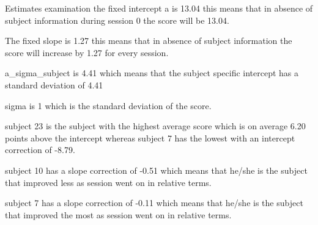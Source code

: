 \documentclass[
  ignorenonframetext,
]{beamer}
\begin{document}
\begin{frame}{Estimates examination}
\protect\hypertarget{estimates-examination}{}
the fixed intercept a is 13.04 this means that in absence of subject
information during session 0 the score will be 13.04.

The fixed slope is 1.27 this means that in absence of subject
information the score will increase by 1.27 for every session.

a\_sigma\_subject is 4.41 which means that the subject specific
intercept has a standard deviation of 4.41

sigma is 1 which is the standard deviation of the score.

subject 23 is the subject with the highest average score which is on
average 6.20 points above the intercept whereas subject 7 has the lowest
with an intercept correction of -8.79.

subject 10 has a slope correction of -0.51 which means that he/she is
the subject that improved less as session went on in relative terms.

subject 7 has a slope correction of -0.11 which means that he/she is the
subject that improved the most as session went on in relative terms.
\end{frame}
\end{document}
